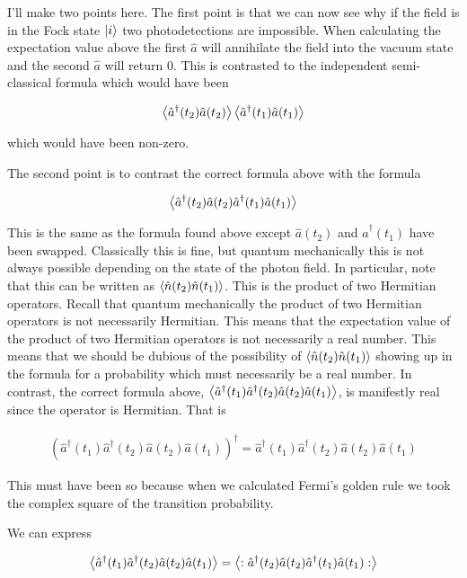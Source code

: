 \documentclass[12pt]{article}
\begin{document}
I'll make two points here. The first point is that we can now see why if the field is in the Fock state $\ket{i}$ two photodetections are impossible. When calculating the expectation value above the first $\hat{a}$ will annihilate the field into the vacuum state and the second $\hat{a}$ will return 0. This is contrasted to the independent semi-classical formula which would have been

\begin{align}
\Braket{\hat{a}^{\dag}(t_2) \hat{a}(t_2)} \Braket{\hat{a}^{\dag}(t_1) \hat{a}(t_1)}
\end{align}

which would have been non-zero. 

The second point is to contrast the correct formula above with the formula

\begin{align}
\Braket{\hat{a}^{\dag}(t_2)\hat{a}(t_2) \hat{a}^{\dag}(t_1)\hat{a}(t_1)}
\end{align}

This is the same as the formula found above except $\hat{a}(t_2)$ and $\hat{a}^{\dag}(t_1)$ have been swapped. Classically this is fine, but quantum mechanically this is not always possible depending on the state of the photon field. 
In particular, note that this can be written as $\Braket{\hat{n}(t_2)\hat{n}(t_1)}$. This is the product of two Hermitian operators. Recall that quantum mechanically the product of two Hermitian operators is not necessarily Hermitian. This means that the expectation value of the product of two Hermitian operators is not necessarily a real number. This means that we should be dubious of the possibility of $\Braket{\hat{n}(t_2)\hat{n}(t_1)}$ showing up in the formula for a probability which must necessarily be a real number. In contrast, the correct formula above, $\Braket{\hat{a}^{\dag}(t_1)\hat{a}^{\dag}(t_2)\hat{a}(t_2)\hat{a}(t_1)}$, is manifestly real since the operator is Hermitian. That is 

\begin{align}
\left(\hat{a}^{\dag}(t_1)\hat{a}^{\dag}(t_2)\hat{a}(t_2)\hat{a}(t_1)\right)^{\dag} = \hat{a}^{\dag}(t_1)\hat{a}^{\dag}(t_2)\hat{a}(t_2)\hat{a}(t_1)
\end{align}

This must have been so because when we calculated Fermi's golden rule we took the complex square of the transition probability.

We can express

\begin{align}
\Braket{\hat{a}^{\dag}(t_1)\hat{a}^{\dag}(t_2)\hat{a}(t_2)\hat{a}(t_1)} = \Braket{:\hat{a}^{\dag}(t_2)\hat{a}(t_2) \hat{a}^{\dag}(t_1)\hat{a}(t_1):}
\end{align}
\end{document}
